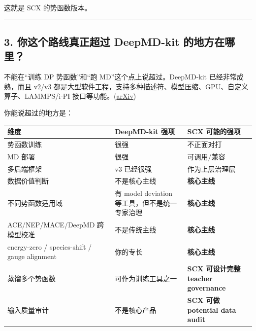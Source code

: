 \documentclass[
  12pt,
]{ctexart}
\begin{document}
这就是 SCX 的势函数版本。

\begin{center}\rule{0.5\linewidth}{0.5pt}\end{center}

\subsection{3. 你这个路线真正超过 DeepMD-kit
的地方在哪里？}\label{ux4f60ux8fd9ux4e2aux8defux7ebfux771fux6b63ux8d85ux8fc7-deepmd-kit-ux7684ux5730ux65b9ux5728ux54eaux91cc}

不能在``训练 DP 势函数''和``跑 MD''这个点上说超过。DeepMD-kit
已经非常成熟，而且 v2/v3
都是大型软件工程，支持多种描述符、模型压缩、GPU、自定义算子、LAMMPS/i-PI
接口等功能。(\href{https://arxiv.org/abs/2501.07314?utm_source=chatgpt.com}{arXiv})

你能说超过的地方是：

\begin{longtable}[]{@{}
  >{\raggedright\arraybackslash}p{}
  >{\raggedright\arraybackslash}p{}
  >{\raggedright\arraybackslash}p{}@{}}
\toprule\noalign{}
\begin{minipage}[b]{\linewidth}\raggedright
维度
\end{minipage} & \begin{minipage}[b]{\linewidth}\raggedright
DeepMD-kit 强项
\end{minipage} & \begin{minipage}[b]{\linewidth}\raggedright
SCX 可能的强项
\end{minipage} \\
\midrule\noalign{}
\endhead
\bottomrule\noalign{}
\endlastfoot
势函数训练 & 很强 & 不正面对打 \\
MD 部署 & 很强 & 可调用/兼容 \\
多后端框架 & v3 已经很强 & 作为上层治理层 \\
数据价值判断 & 不是核心主线 & \textbf{核心主线} \\
不同势函数适用域 & 有 model deviation 等工具，但不是统一专家治理 &
\textbf{核心主线} \\
ACE/NEP/MACE/DeepMD 跨模型校准 & 不是传统主线 & \textbf{核心主线} \\
energy-zero / species-shift / gauge alignment & 你的专长 &
\textbf{核心主线} \\
蒸馏多个势函数 & 可作为训练工具之一 & \textbf{SCX 可设计完整 teacher
governance} \\
输入质量审计 & 不是核心产品 & \textbf{SCX 可做 potential data audit} \\
\end{longtable}
\end{document}
